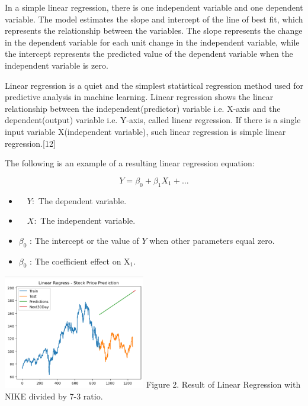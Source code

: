 \documentclass[conference]{IEEEtran}
\begin{document}
{In a simple linear regression, there is one independent variable and one dependent variable. The model estimates the slope and intercept of the line of best fit, which represents the relationship between the variables. The slope represents the change in the dependent variable for each unit change in the independent variable, while the intercept represents the predicted value of the dependent variable when the independent variable is zero.

Linear regression is a quiet and the simplest statistical regression method used for predictive analysis in machine learning. Linear regression shows the linear relationship between the independent(predictor) variable i.e. X-axis and the dependent(output) variable i.e. Y-axis, called linear regression. If there is a single input variable X(independent variable), such linear regression is simple linear regression.[12]

The following is an example of a resulting linear regression equation:

$$
Y=\beta_{0}+\beta_{1} X_{1}+\ldots
$$

\begin{itemize}
  \item $\quad Y:$ The dependent variable.
  \item $\quad X:$ The independent variable.
  \item $\beta_{0}$ : The intercept or the value of $Y$ when other parameters equal zero.
  \item $\beta_{0}$ : The coefficient effect on $\mathrm{X}_{1}$.
\end{itemize}

\begin{center}
\includegraphics[width=\linewidth, height = 5cm, center]{LR.png}
Figure 2. Result of Linear Regression with NIKE divided by 7-3 ratio.
\end{center}


}
\end{document}
